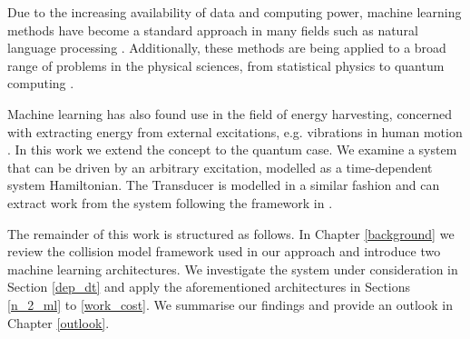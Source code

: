 Due to the increasing availability of data and computing power, machine learning methods have become a standard approach in many fields such as natural language processing \cite{DBLP:journals/corr/VaswaniSPUJGKP17}.
Additionally, these methods are being applied to a broad range of problems in the physical sciences, from statistical physics to quantum computing \cite{Carleo_2019, wise2021using}.

Machine learning has also found use in the field of energy harvesting, concerned with extracting energy from external excitations, e.g. vibrations in human motion \cite{Liu2019}.
In this work we extend the concept to the quantum case.
We examine a system that can be driven by an arbitrary excitation, modelled as a time-dependent system Hamiltonian.
The Transducer is modelled in a similar fashion and can extract work from the system following the framework in \cite{beyer2020}.


The remainder of this work is structured as follows.
In Chapter \ref{background} we review the collision model framework used in our approach and introduce two machine learning architectures.
We investigate the system under consideration in Section \ref{dep_dt} and apply the aforementioned architectures in Sections \ref{n_2_ml} to \ref{work_cost}.
We summarise our findings and provide an outlook in Chapter \ref{outlook}.